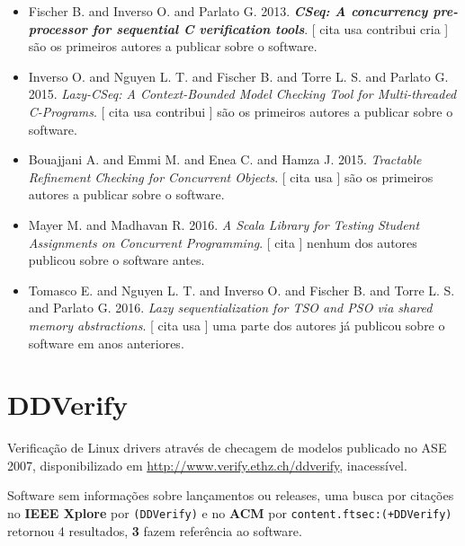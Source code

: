 \begin{itemize}
\item Fischer B. and Inverso O. and Parlato G.
      2013.
        \textbf{\textit{ CSeq: A concurrency pre-processor for sequential C verification tools}}.
      [
          cita
          usa
          contribui
          cria
      ]
são os primeiros autores a publicar sobre o software.
\item Inverso O. and Nguyen L. T. and Fischer B. and Torre L. S. and Parlato G.
      2015.
        \textit{ Lazy-CSeq: A Context-Bounded Model Checking Tool for Multi-threaded C-Programs}.
      [
          cita
          usa
          contribui
      ]
são os primeiros autores a publicar sobre o software.
\item Bouajjani A. and Emmi M. and Enea C. and Hamza J.
      2015.
        \textit{ Tractable Refinement Checking for Concurrent Objects}.
      [
          cita
          usa
      ]
são os primeiros autores a publicar sobre o software.
\item Mayer M. and Madhavan R.
      2016.
        \textit{ A Scala Library for Testing Student Assignments on Concurrent Programming}.
      [
          cita
      ]
nenhum dos autores publicou sobre o software antes.
\item Tomasco E. and Nguyen L. T. and Inverso O. and Fischer B. and Torre L. S. and Parlato G.
      2016.
        \textit{ Lazy sequentialization for TSO and PSO via shared memory abstractions}.
      [
          cita
          usa
      ]
uma parte dos autores já publicou sobre o software em anos anteriores.
\end{itemize}
\section{DDVerify}

Verificação de Linux drivers através de checagem de modelos
publicado no ASE 2007,
disponibilizado em \url{http://www.verify.ethz.ch/ddverify},
inacessível.

Software sem informações sobre lançamentos ou releases,
uma busca por citações no {\bf IEEE Xplore} por
\texttt{(DDVerify)}
e no {\bf ACM} por
\texttt{content.ftsec:(+DDVerify)}
retornou
4 resultados,
{\bf 3} fazem referência ao software.


